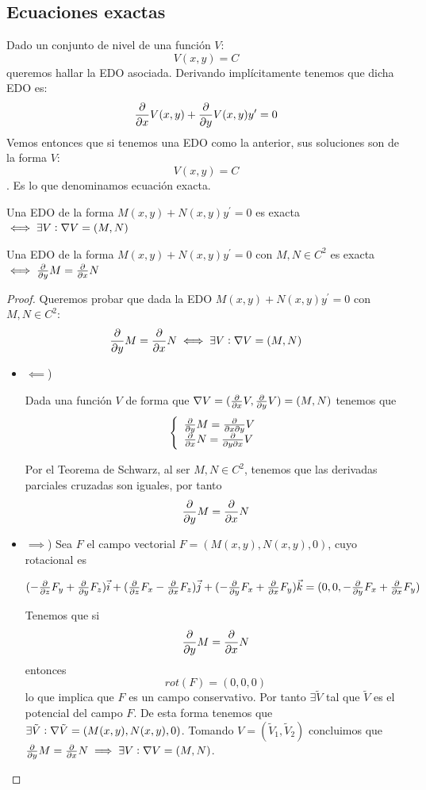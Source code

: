 \documentclass{mathnotes}
\begin{document}
\subsection{Ecuaciones exactas}
Dado un conjunto de nivel de una función $V$: $$V(x,y) = C$$
queremos hallar la EDO asociada. Derivando implícitamente tenemos que dicha EDO es: 
$$\frac{\partial}{\partial x}V(x,y) + \frac{\partial}{\partial y}V(x,y)y^\prime = 0$$
Vemos entonces que si tenemos una EDO como la anterior, sus soluciones son de la forma $V$: $$V(x,y) = C$$.
Es lo que denominamos ecuación exacta.

\begin{definition}
Una EDO de la forma $M(x,y) + N(x,y)y^\prime = 0$ es exacta $\iff \exists V : \nabla V = (M,N)$
\end{definition}

\begin{theorem}
Una EDO de la forma $M(x,y) + N(x,y)y^\prime = 0$ con $M,N \in C^2$ es exacta $\iff \frac{\partial}{\partial y}{M} = \frac{\partial}{\partial x}N$
\end{theorem}
\begin{proof}
Queremos probar que dada la EDO $M(x,y) + N(x,y)y^\prime = 0$ con $M,N \in C^2$:
$$\frac{\partial}{\partial y}M = \frac{\partial}{\partial x}N \iff \exists V : \nabla V = (M,N)$$
\begin{itemize}
\item $\impliedby$)

Dada una función $V$ de forma que $\nabla V = (\frac{\partial}{\partial x}V, \frac{\partial}{\partial y}V) = (M, N)$ tenemos que 
\begin{equation*}
  \left\lbrace
  \begin{array}{l}
     \frac{\partial}{\partial y}M = \frac{\partial}{\partial x \partial y}V \\
     \frac{\partial}{\partial x}N = \frac{\partial}{\partial y \partial x}V  \\
  \end{array}
  \right.
\end{equation*}

Por el Teorema de Schwarz, al ser $M,N\in C^2$, tenemos que las derivadas parciales cruzadas son iguales, por tanto $$\frac{\partial}{\partial y}M = \frac{\partial}{\partial x}N$$

\item $\implies$)
Sea $F$ el campo vectorial $F = (M(x,y),N(x,y),0)$, cuyo rotacional es 

$(-\frac{\partial}{\partial z}F_y+\frac{\partial}{\partial y}F_z)\vec{i} + (\frac{\partial}{\partial z}F_x-\frac{\partial}{\partial x}F_z)\vec{j}+(-\frac{\partial}{\partial y}F_x+\frac{\partial}{\partial x}F_y)\vec{k} = (0,0, -\frac{\partial}{\partial y}F_x+\frac{\partial}{\partial x}F_y)$

Tenemos que si $$\frac{\partial}{\partial y}M = \frac{\partial}{\partial x}N$$ entonces $$rot(F) = (0,0,0)$$ lo que implica que $F$ es un campo conservativo. Por tanto $\exists \tilde{V}$ tal que $\tilde{V}$ es el potencial del campo $F$. De esta forma tenemos que $\exists \tilde{V} : \nabla \tilde{V} = (M(x,y),N(x,y),0)$. Tomando $V = (\tilde{V}_1, \tilde{V}_2)$ concluimos que $\frac{\partial}{\partial y}M = \frac{\partial}{\partial x}N \implies \exists V : \nabla V = (M,N)$.
\end{itemize}
\end{proof}
\end{document}

